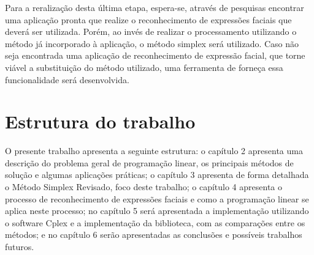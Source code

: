 Para a reralização desta última etapa, espera-se, através de pesquisas encontrar uma aplicação pronta que realize o reconhecimento de expressões faciais que deverá ser utilizada. Porém, ao invés de realizar o processamento utilizando o método já incorporado à aplicação, o método simplex será utilizado. Caso não seja encontrada uma aplicação de reconhecimento de expressão facial, que torne viável a substituição do método utilizado, uma ferramenta de forneça essa funcionalidade será desenvolvida.

\section{Estrutura do trabalho}
O presente trabalho apresenta a seguinte estrutura: o capítulo 2 apresenta uma descrição do problema geral de programação linear, os principais métodos de solução e algumas aplicações práticas; o capítulo 3 apresenta de forma detalhada o Método Simplex Revisado, foco deste trabalho; o capítulo 4 apresenta o processo de reconhecimento de expressões faciais e como a programação linear se aplica neste processo; no capítulo 5 será apresentada a implementação utilizando o software Cplex e a implementação da biblioteca, com as comparações entre os métodos; e no capítulo 6 serão apresentadas as conclusões e possíveis trabalhos futuros. 
